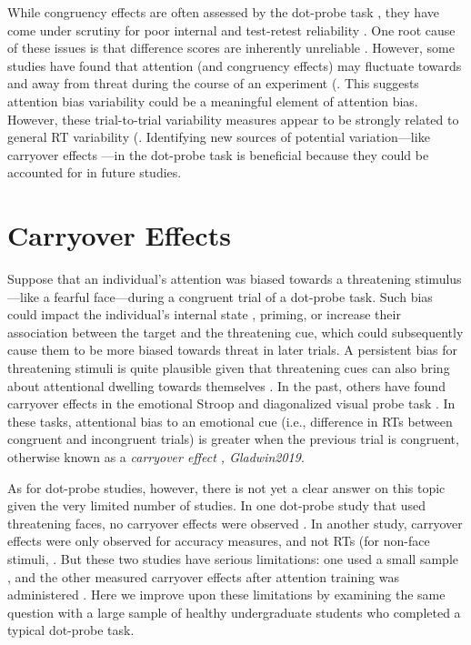 \documentclass{article}
\begin{document}
While congruency effects are often assessed by the dot-probe task \parencite{Kruijt2018, Mogg2017}, they have come under scrutiny for poor internal and test-retest reliability \parencite{Schmukle2005, Staugaard2009}. One root cause of these issues is that difference scores are inherently unreliable \parencite{Hedge2018}. However, some studies have found that attention (and congruency effects) may fluctuate towards and away from threat during the course of an experiment (\parencite{Zvielli2015}. This suggests attention bias variability could be a meaningful element of attention bias. However, these trial-to-trial variability measures appear to be strongly related to general RT variability (\parencite{Carlson2020, Kruijt2016}. Identifying new sources of potential variation—like carryover effects —in the dot-probe task is beneficial because they could be accounted for in future studies.

\section{Carryover Effects}

Suppose that an individual's attention was biased towards a threatening stimulus—like a fearful face—during a congruent trial of a dot-probe task. Such bias could impact the individual's internal state \parencite{Panksepp2011}, priming, or increase their association between the target and the threatening cue, which could subsequently cause them to be more biased towards threat in later trials. A persistent bias for threatening stimuli is quite plausible given that threatening cues can also bring about attentional dwelling towards themselves \parencite{Carlson2014, Fox2001}. In the past, others have found carryover effects in the emotional Stroop \parencite{Cane2009, Clarke2015, Waters2005, Wilson2007} and diagonalized visual probe task \parencite{Gladwin2019, Gladwin2020, Gladwin2019a}. In these tasks, attentional bias to an emotional cue (i.e., difference in RTs between congruent and incongruent trials) is greater when the previous trial is congruent, otherwise known as a \emph{carryover effect , Gladwin2019}.

As for dot-probe studies, however, there is not yet a clear answer on this topic given the very limited number of studies. In one dot-probe study that used threatening faces, no carryover effects were observed \parencite{Hill2016}. In another study, carryover effects were only observed for accuracy measures, and not RTs (for non-face stimuli, \parencite{Gladwin2017}. But these two studies have serious limitations: one used a small sample \parencite{Gladwin2017}, and the other measured carryover effects after attention training was administered \parencite{Hill2016}. Here we improve upon these limitations by examining the same question with a large sample of healthy undergraduate students who completed a typical dot-probe task.
\end{document}
